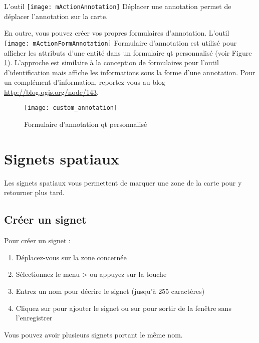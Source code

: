 L'outil \texttt{[image: mActionAnnotation]} Déplacer une annotation permet de déplacer l'annotation sur la carte.  

 

En outre, vous pouvez créer vos propres formulaires d'annotation. L'outil \texttt{[image: mActionFormAnnotation]} Formulaire d'annotation est utilisé pour afficher les attributs d'une entité dans un formulaire qt personnalisé (voir Figure \ref{fig:custom-annotations}). L'approche est similaire à la conception de formulaires pour l'outil d'identification mais affiche les informations sous la forme d'une annotation. Pour un complément d'information, reportez-vous au blog \url{http://blog.qgis.org/node/143}.

\begin{figure}[ht]
   \centering
   \texttt{[image: custom\_annotation]}
   \caption{Formulaire d'annotation qt personnalisé \nixcaption}
   \label{fig:custom-annotations}
\end{figure}

\newpage


\section{Signets spatiaux} \label{sec:bookmarks}

Les signets spatiaux vous permettent de marquer une zone de la carte pour y retourner plus tard.

\subsection{Créer un signet}
Pour créer un signet :
\begin{enumerate}
\item Déplacez-vous sur la zone concernée
\item Sélectionnez le menu  >  ou appuyez sur la touche 
\item Entrez un nom pour décrire le signet (jusqu'à 255 caractères)
\item Cliquez sur  pour ajouter le signet ou sur  pour sortir de la fenêtre sans l'enregistrer
\end{enumerate}

Vous pouvez avoir plusieurs signets portant le même nom.

